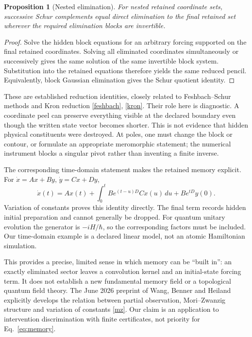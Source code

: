 \documentclass[11pt]{article}
\newtheorem{proposition}{Proposition}
\begin{document}
\begin{proposition}[Nested elimination]
For nested retained coordinate sets, successive Schur complements equal direct elimination to the final retained set wherever the required elimination blocks are invertible.
\end{proposition}
\begin{proof}
Solve the hidden block equations for an arbitrary forcing supported on the final retained coordinates. Solving all eliminated coordinates simultaneously or successively gives the same solution of the same invertible block system. Substitution into the retained equations therefore yields the same reduced pencil. Equivalently, block Gaussian elimination gives the Schur quotient identity.
\end{proof}

These are established reduction identities, closely related to Feshbach--Schur methods and Kron reduction \href{https://arxiv.org/abs/0704.3244}{[feshbach]}, \href{https://arxiv.org/abs/1102.2950}{[kron]}. Their role here is diagnostic. A coordinate peel can preserve everything visible at the declared boundary even though the written state vector becomes shorter. This is not evidence that hidden physical constituents were destroyed. At poles, one must change the block or contour, or formulate an appropriate meromorphic statement; the numerical instrument blocks a singular pivot rather than inventing a finite inverse.

The corresponding time-domain statement makes the retained memory explicit. For $\dot x=Ax+By$, $\dot y=Cx+Dy$,
\begin{equation}
\dot x(t)=Ax(t)+\int_0^t B e^{(t-u)D}C x(u)\,du+B e^{tD}y(0).
\label{eq:memory}
\end{equation}
Variation of constants proves this identity directly. The final term records hidden initial preparation and cannot generally be dropped. For quantum unitary evolution the generator is $-iH/\hbar$, so the corresponding factors must be included. Our time-domain example is a declared linear model, not an atomic Hamiltonian simulation.

This provides a precise, limited sense in which memory can be ``built in'': an exactly eliminated sector leaves a convolution kernel and an initial-state forcing term. It does not establish a new fundamental memory field or a topological quantum field theory. The June 2026 preprint of Wang, Benner and Heiland explicitly develops the relation between partial observation, Mori--Zwanzig structure and variation of constants \href{https://arxiv.org/abs/2606.23341}{[mz]}. Our claim is an application to intervention discrimination with finite certificates, not priority for Eq.~\eqref{eq:memory}.
\end{document}
